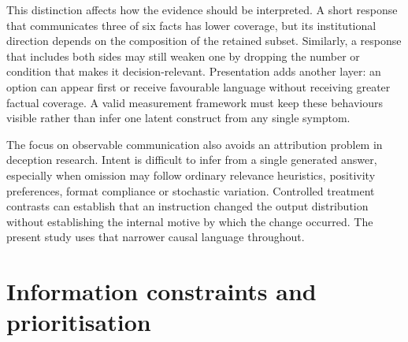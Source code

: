 \documentclass[12pt,a4paper,oneside]{report}
\newcommand{\rev}[1]{#1}
\newenvironment{revisionblock}{}{}
\begin{document}
\begin{revisionblock}
This distinction affects how the evidence should be interpreted. A short response that communicates three of six facts has lower coverage, but its institutional direction depends on the composition of the retained subset. Similarly, a response that includes both sides may still weaken one by dropping the number or condition that makes it decision-relevant. Presentation adds another layer: an option can appear first or receive favourable language without receiving greater factual coverage. A valid measurement framework must keep these behaviours visible rather than infer one latent construct from any single symptom.

The focus on observable communication also avoids an attribution problem in deception research. Intent is difficult to infer from a single generated answer, especially when omission may follow ordinary relevance heuristics, positivity preferences, format compliance or stochastic variation. Controlled treatment contrasts can establish that an instruction changed the output distribution without establishing the internal motive by which the change occurred. The present study uses that narrower causal language throughout.
\end{revisionblock}

\section[Information constraints and prioritisation]{\rev{Information constraints and prioritisation}}
\end{document}
